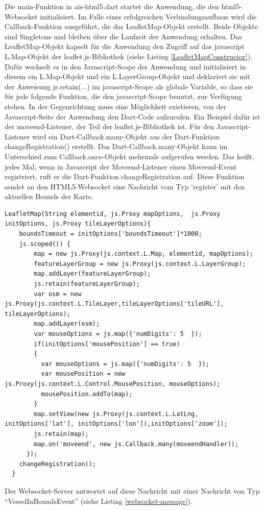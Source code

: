 Die main-Funktion in ais-html5.dart startet die Anwendung, die den html5-Websocket initialisiert. Im Falle eines erfolgreichen Verbindungsaufbaus wird die Callback-Funktion ausgeführt, die das LeafletMap-Objekt erstellt. Beide Objekte sind Singletons und bleiben über die Laufzeit der Anwendung erhalten.
Das LeafletMap-Objekt kapselt für die Anwendung den Zugriff auf das javascript L.Map-Objekt der leaflet.js-Bibliothek (siehe Listing \ref{LeafletMapConstructor}). Dafür wechselt es in den Javascript-Scope der Anwendung und initialisiert in diesem ein L.Map-Objekt und ein L.LayerGroup-Objekt und deklariert sie mit der Anweisung js.retain(...) im javascript-Scope als globale Variable, so dass sie für jede folgende Funktion, die den javascript-Scope benutzt, zur Verfügung stehen.
In der Gegenrichtung muss eine Möglichkeit existieren, von der Javascript-Seite der Anwendung den Dart-Code aufzurufen. Ein Beispiel dafür ist der moveend-Listener, der Teil der leaflet.js-Bibliothek ist. Für den Javascript-Listener wird ein Dart-Callback.many-Objekt aus der Dart-Funktion changeRegistration() erstellt. Das Dart-Callback.many-Objekt kann im Unterschied zum Callback.once-Objekt mehrmals aufgerufen werden. Das heißt, jedes Mal, wenn in Javascript der Moveend-Listener einen Moveend-Event registriert, ruft er die Dart-Funktion changeRegistration auf. Diese Funktion sendet an den HTML5-Websocket eine Nachricht vom Typ ‘register’ mit den aktuellen Bounds der Karte.

\begin{lstlisting}[caption=Konstruktor des LeafletMap-Objektes mit Zugriff auf den javascript-Scope, label=LeafletMapConstructor]
LeafletMap(String elementid, js.Proxy mapOptions,  js.Proxy initOptions, js.Proxy tileLayerOptions){
    boundsTimeout = initOptions['boundsTimeout']*1000;
    js.scoped(() {
        map = new js.Proxy(js.context.L.Map, elementid, mapOptions);
        featureLayerGroup = new js.Proxy(js.context.L.LayerGroup);
        map.addLayer(featureLayerGroup);
        js.retain(featureLayerGroup);
        var osm = new js.Proxy(js.context.L.TileLayer,tileLayerOptions['tileURL'], tileLayerOptions);
        map.addLayer(osm);
        var mouseOptions = js.map({'numDigits': 5  });
        if(initOptions['mousePosition'] == true)
        {
          var mouseOptions = js.map({'numDigits': 5  });
          var mousePosition = new js.Proxy(js.context.L.Control.MousePosition, mouseOptions);
          mousePosition.addTo(map);
        }
        map.setView(new js.Proxy(js.context.L.LatLng, initOptions['lat'], initOptions['lon']),initOptions['zoom']);
        js.retain(map);
        map.on('moveend', new js.Callback.many(moveendHandler));
      });
    changeRegistration();
  }
\end{lstlisting}
Der Websocket-Server antwortet auf diese Nachricht mit einer Nachricht von Typ “VesselInBoundsEvent” (siehe Listing \ref{websocket-message}).

